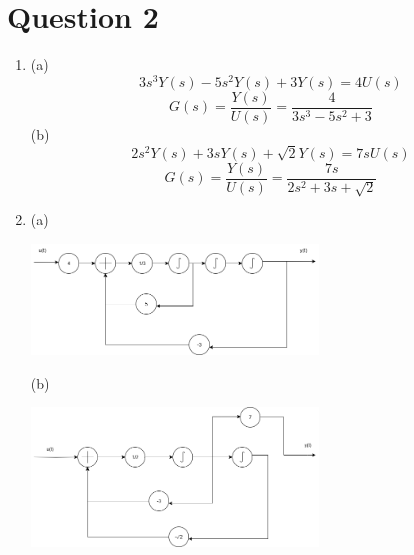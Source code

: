 \documentclass[12pt]{article}
\begin{document}
\section*{Question 2}
\begin{enumerate}[label=\roman*.]
    \item (a)
    \[3s^3Y(s)-5s^2Y(s)+3Y(s)=4U(s)\]
    \[G(s) = \frac{Y(s)}{U(s)} = \frac{4}{3s^3-5s^2+3}\]
    (b)
    \[2s^2Y(s)+3sY(s)+\sqrt{2}Y(s) = 7sU(s)\]
    \[G(s) = \frac{Y(s)}{U(s)} = \frac{7s}{2s^2+3s+\sqrt{2}}\]

    \item (a)
    \begin{center}
        \includegraphics[width=0.6\textwidth]{Hw1_Q2BDa.png}
    \end{center}
    (b)
    \begin{center}
        \includegraphics[width=0.6\textwidth]{Hw1_Q2BDb.png}
    \end{center}
    

\end{enumerate}
\end{document}
